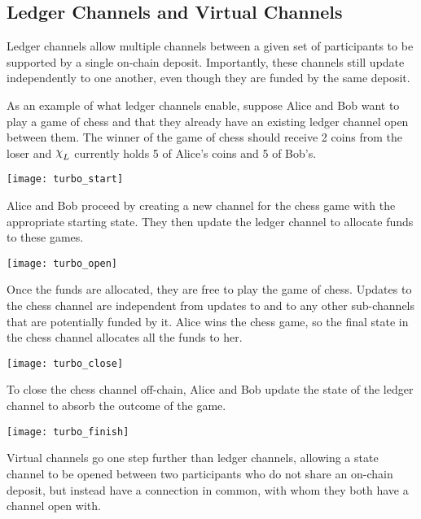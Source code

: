 \documentclass{article}
\begin{document}
\subsection{Ledger Channels and Virtual Channels}


Ledger channels allow multiple channels between a given set of participants to be supported by a single on-chain deposit.
Importantly, these channels still update independently to one another, even though they are funded by the same deposit.

As an example of what ledger channels enable, suppose Alice and Bob want to play a game of chess and that
they already have an existing ledger channel open between them.
The winner of the game of chess should receive 2 coins from the loser and $\rchi_L$ currently holds
5 of Alice's coins and 5 of Bob's.

\begin{center}
  \texttt{[image: turbo\_start]} %
\end{center}

Alice and Bob proceed by creating a new channel for the chess game with the appropriate starting state.
They then update the ledger channel to allocate funds to these games.

\begin{center}
  \texttt{[image: turbo\_open]} %
\end{center}

Once the funds are allocated, they are free to play the game of chess.
Updates to the chess channel are independent from updates to and to
any other sub-channels that are potentially funded by it. 
Alice wins the chess game, so the final state in the chess channel allocates all the
funds to her.

\begin{center}
  \texttt{[image: turbo\_close]} %
\end{center}

To close the chess channel off-chain, Alice and Bob update the state of the ledger channel to absorb the outcome of the game.

\begin{center}
  \texttt{[image: turbo\_finish]} %
\end{center}

Virtual channels go one step further than ledger channels, allowing a state channel to be opened between two participants who do not share an on-chain deposit, but instead have a connection in common, with whom they both have a channel open with.
\end{document}

